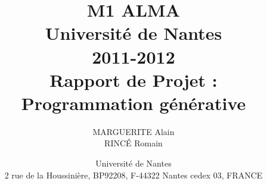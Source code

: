 \documentclass[12pt,a4paper,utf8x]{report}
\title
{
	\normalsize{ M1 ALMA\\ 
	Université de Nantes\\
	2011-2012}\\
	\vspace{15mm}
	\Huge{Rapport de Projet :\\Programmation générative }
}
\author{MARGUERITE Alain\\ RINCÉ Romain
	\vspace{45mm}
}
\date
{	
	\normalsize{Université de Nantes \\ 2 rue de la Houssinière, BP92208, F-44322 Nantes cedex 03, FRANCE
	\\ 
	\vspace{5mm}	
	}
}
\begin{document}
\renewcommand{\labelitemi}{$\bullet$} 	
\maketitle


\clearpage

\tableofcontents
\clearpage

\begin{onehalfspace}

%
%
%
%
%

\end{onehalfspace}



\listoffigures

\printindex

\appendix



\end{document}
